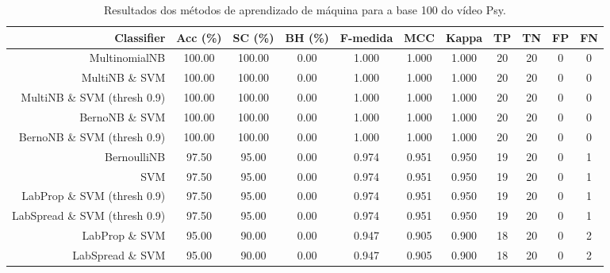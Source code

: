 \begin{table}[!htb]
\centering
\caption{Resultados dos métodos de aprendizado de máquina para a base 100 do vídeo Psy.}
\label{tab:Psy-100}
\begin{tabular}{r|c|c|c|c|c|c|c|c|c|c}
\hline\hline
Classifier & Acc (\%) & SC (\%) & BH (\%) & F-medida & MCC & Kappa & TP & TN & FP & FN \\ \hline
MultinomialNB & 100.00 & 100.00 & 0.00 & 1.000 & 1.000 & 1.000 & 20 & 20 & 0 & 0 \\ 
MultiNB \& SVM & 100.00 & 100.00 & 0.00 & 1.000 & 1.000 & 1.000 & 20 & 20 & 0 & 0 \\ 
MultiNB \& SVM (thresh 0.9) & 100.00 & 100.00 & 0.00 & 1.000 & 1.000 & 1.000 & 20 & 20 & 0 & 0 \\ 
BernoNB \& SVM & 100.00 & 100.00 & 0.00 & 1.000 & 1.000 & 1.000 & 20 & 20 & 0 & 0 \\ 
BernoNB \& SVM (thresh 0.9) & 100.00 & 100.00 & 0.00 & 1.000 & 1.000 & 1.000 & 20 & 20 & 0 & 0 \\ 
BernoulliNB & 97.50 & 95.00 & 0.00 & 0.974 & 0.951 & 0.950 & 19 & 20 & 0 & 1 \\ 
SVM & 97.50 & 95.00 & 0.00 & 0.974 & 0.951 & 0.950 & 19 & 20 & 0 & 1 \\ 
LabProp \& SVM (thresh 0.9) & 97.50 & 95.00 & 0.00 & 0.974 & 0.951 & 0.950 & 19 & 20 & 0 & 1 \\ 
LabSpread \& SVM (thresh 0.9) & 97.50 & 95.00 & 0.00 & 0.974 & 0.951 & 0.950 & 19 & 20 & 0 & 1 \\ 
LabProp \& SVM & 95.00 & 90.00 & 0.00 & 0.947 & 0.905 & 0.900 & 18 & 20 & 0 & 2 \\ 
LabSpread \& SVM & 95.00 & 90.00 & 0.00 & 0.947 & 0.905 & 0.900 & 18 & 20 & 0 & 2 \\ 
\hline\hline
\end{tabular}
\end{table}
